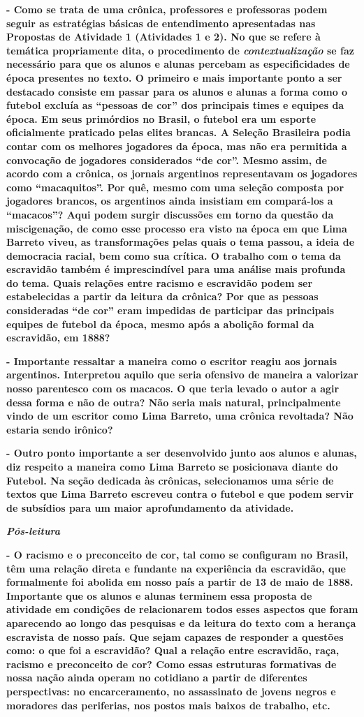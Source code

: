 \textbf{- Como se trata de uma crônica, professores e professoras podem
seguir as estratégias básicas de entendimento apresentadas nas Propostas
de Atividade 1 (Atividades 1 e 2). No que se refere à temática
propriamente dita, o procedimento de \emph{contextualização} se faz
necessário para que os alunos e alunas percebam as especificidades de
época presentes no texto. O primeiro e mais importante ponto a ser
destacado consiste em passar para os alunos e alunas a forma como o
futebol excluía as ``pessoas de cor'' dos principais times e equipes da
época. Em seus primórdios no Brasil, o futebol era um esporte
oficialmente praticado pelas elites brancas. A Seleção Brasileira podia
contar com os melhores jogadores da época, mas não era permitida a
convocação de jogadores considerados ``de cor''. Mesmo assim, de acordo
com a crônica, os jornais argentinos representavam os jogadores como
``macaquitos''. Por quê, mesmo com uma seleção composta por jogadores
brancos, os argentinos ainda insistiam em compará-los a ``macacos''?
Aqui podem surgir discussões em torno da questão da miscigenação, de
como esse processo era visto na época em que Lima Barreto viveu, as
transformações pelas quais o tema passou, a ideia de democracia racial,
bem como sua crítica. O trabalho com o tema da escravidão também é
imprescindível para uma análise mais profunda do tema. Quais relações
entre racismo e escravidão podem ser estabelecidas a partir da leitura
da crônica? Por que as pessoas consideradas ``de cor'' eram impedidas de
participar das principais equipes de futebol da época, mesmo após a
abolição formal da escravidão, em 1888? }

\textbf{- Importante ressaltar a maneira como o escritor reagiu aos
jornais argentinos. Interpretou aquilo que seria ofensivo de maneira a
valorizar nosso parentesco com os macacos. O que teria levado o autor a
agir dessa forma e não de outra? Não seria mais natural, principalmente
vindo de um escritor como Lima Barreto, uma crônica revoltada? Não
estaria sendo irônico? }

\textbf{- Outro ponto importante a ser desenvolvido junto aos alunos e
alunas, diz respeito a maneira como Lima Barreto se posicionava diante
do Futebol. Na seção dedicada às crônicas, selecionamos uma série de
textos que Lima Barreto escreveu contra o futebol e que podem servir de
subsídios para um maior aprofundamento da atividade. }

\emph{\textbf{Pós-leitura}}

\textbf{- O racismo e o preconceito de cor, tal como se configuram no
Brasil, têm uma relação direta e fundante na experiência da escravidão,
que formalmente foi abolida em nosso país a partir de 13 de maio de
1888. Importante que os alunos e alunas terminem essa proposta de
atividade em condições de relacionarem todos esses aspectos que foram
aparecendo ao longo das pesquisas e da leitura do texto com a herança
escravista de nosso país. Que sejam capazes de responder a questões
como: o que foi a escravidão? Qual a relação entre escravidão, raça,
racismo e preconceito de cor? Como essas estruturas formativas de nossa
nação ainda operam no cotidiano a partir de diferentes perspectivas: no
encarceramento, no assassinato de jovens negros e moradores das
periferias, nos postos mais baixos de trabalho, etc. }


